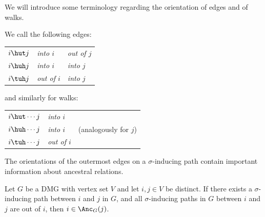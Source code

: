 We will introduce some terminology regarding the orientation of edges and of walks.
\begin{Def}
  We call the following edges:
  \begin{center}\begin{tabular}{lll}
    $i \hut j$ & \emph{into $i$}   & \emph{out of $j$} \\
    $i \huh j$ & \emph{into $i$}   & \emph{into $j$} \\
    $i \tuh j$ & \emph{out of $i$} & \emph{into $j$} 
  \end{tabular}\end{center}
  and similarly for walks:
  \begin{center}\begin{tabular}{ll@{\qquad}l}
    $i \hut \cdots j$  & \emph{into $i$}  & \\
    $i \huh \cdots j$  & \emph{into $i$}  & (analogously for $j$) \\
    $i \tuh \cdots j$  & \emph{out of $i$} & \\
  \end{tabular}\end{center}
\end{Def}
The orientations of the outermost edges on a $\sigma$-inducing path contain important information about ancestral relations.
\begin{Lem}\label{lem:sigma-inducing_path_out-of}
  Let $G$ be a DMG with vertex set $V$ and let $i,j \in V$ be distinct. 
  If there exists a $\sigma$-inducing path between $i$ and $j$ in $G$,
  and all $\sigma$-inducing paths in $G$ between $i$ and $j$ are out of $i$, then
    $i \in \Anc_G(j)$.
\end{Lem}

